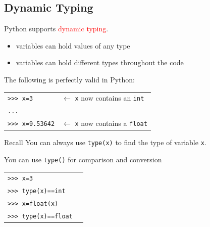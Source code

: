 \documentclass[t,handout,9pt]{beamer}
\begin{document}
\subsection{Dynamic Typing}
\begin{frame}
Python supports \textcolor{red}{dynamic typing}.
\begin{itemize}
	\item variables can hold values of any type
	\item variables can hold different types throughout the code
\end{itemize}
The following is perfectly valid in Python:
\begin{table}[]
\begin{tabular}{ll}
\texttt{>{}>{}> x=3} &  $\leftarrow$ \texttt{x} now contains an \texttt{int}\\
\texttt{...}        &  \\
\texttt{>{}>{}> x=9.53642}        & $\leftarrow$ \texttt{x} now contains a \texttt{float}  \\
\end{tabular}
\end{table}
\begin{block}{Recall}
You can always use \texttt{type(x)} to find the type of variable \texttt{x}.
\end{block}
You can use \texttt{type()} for comparison and conversion
\begin{table}[]
\begin{tabular}{ll}
\texttt{>{}>{}> x=3} &\\
\texttt{>{}>{}> type(x)==int}        &  \\
\texttt{>{}>{}> x=float(x)}  &  \\
\texttt{>{}>{}> type(x)==float}        &  \\
\end{tabular}
\end{table}
\end{frame}
\end{document}
